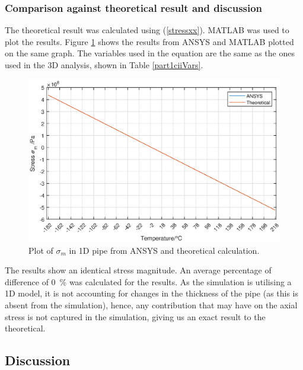 \subsubsection{Comparison against theoretical result and discussion}
The theoretical result was calculated using (\ref{stressxx}). MATLAB was used to plot the results. Figure \ref{part1d4} shows the results from ANSYS and MATLAB plotted on the same graph. The variables used in the equation are the same as the ones used in the 3D analysis, shown in Table \ref{part1ciiVars}.
\begin{figure}[H]
    \centering
    \includegraphics[width = \textwidth]{img/part1dii.eps}
    \caption{Plot of $\sigma_m$ in 1D pipe from ANSYS and theoretical calculation.}
    \label{part1d4}
\end{figure}
The results show an identical stress magnitude. An average percentage of difference of \SI{0}{\percent} was calculated for the results. As the simulation is utilising a 1D model, it is not accounting for changes in the thickness of the pipe (as this is absent from the simulation), hence, any contribution that may have on the axial stress is not captured in the simulation, giving us an exact result to the theoretical.
\subsection{Discussion}
